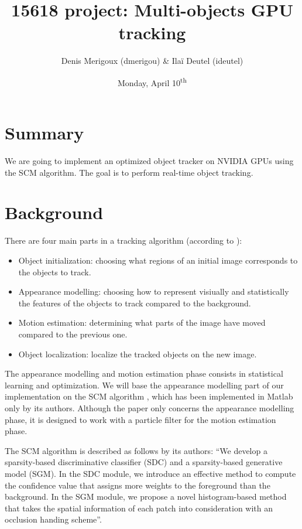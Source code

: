 \documentclass[11pt,english,letter]{article}
\title{15618 project: Multi-objects GPU tracking}
\author{Denis Merigoux (dmerigou) \& Ilaï Deutel (ideutel)}
\date{Monday, April 10\textsuperscript{th}}
\begin{document}
\maketitle


\section{Summary}

We are going to implement an optimized object tracker on NVIDIA GPUs using the SCM algorithm. The goal is to perform real-time object tracking.

\section{Background}

There are four main parts in a tracking algorithm (according to \cite{DBLP:journals/corr/abs-1303-4803}):
\begin{itemize}
    \item Object initialization: choosing what regions of an initial image corresponds to the objects to track.
    \item Appearance modelling: choosing how to represent visiually and statistically the features of the objects to track compared to the background.
    \item Motion estimation: determining what parts of the image have moved compared to the previous one.
    \item Object localization: localize the tracked objects on the new image.
\end{itemize}

The appearance modelling and motion estimation phase consists in statistical learning and optimization. We will base the appearance modelling part of our implementation on the SCM algorithm \cite{6247882}, which has been implemented in Matlab only by its authors. Although the paper only concerns the appearance modelling phase, it is designed to work with a particle filter for the motion estimation phase.

The SCM algorithm is described as follows by its authors: \enquote{We develop a sparsity-based discriminative classifier (SDC) and a sparsity-based generative model (SGM). In the SDC module, we introduce an effective method to compute the confidence value that assigns more weights to the foreground than the background. In the SGM module, we propose a novel histogram-based method that takes the spatial information of each patch into consideration with an occlusion handing scheme}.
\end{document}
